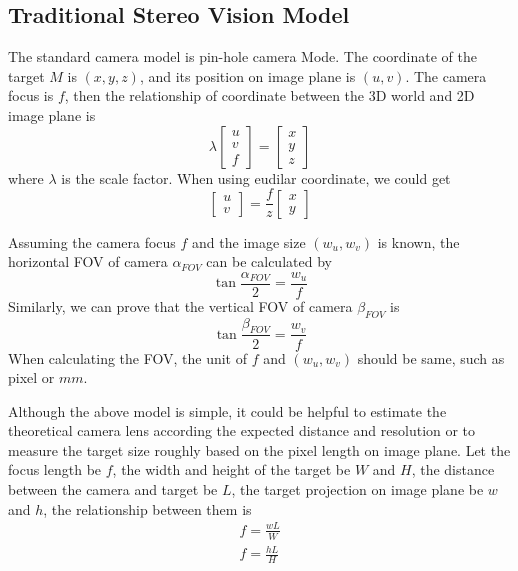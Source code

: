 \subsection{Traditional Stereo Vision Model}
The standard camera model is pin-hole camera Mode. The coordinate of the target $M$ is $(x,y,z)$, and its position on image plane is $(u,v)$. The camera focus is $f$, then the relationship of coordinate between the 3D world and 2D image plane is 
\begin{equation}
\lambda\left[ {\begin{array}{*{20}{c}}
	u \\ 
	v \\ 
	f 
	\end{array}} \right] =\left[ {\begin{array}{*{20}{c}}
	x \\ 
	y \\ 
	z 
	\end{array}} \right]
\end{equation}
where $\lambda$ is the scale factor. When using eudilar coordinate, we could get
\begin{equation}
\left[ {\begin{array}{*{20}{c}}
	u \\ 
	v 
	\end{array}} \right] =\frac{f}{z} \left[ {\begin{array}{*{20}{c}}
	x \\ 
	y   
	\end{array}} \right]
\end{equation}

Assuming the camera focus $f$ and the image size $(w_u,w_v)$ is known, the horizontal FOV of camera $\alpha_{FOV}$ can be calculated by
\begin{equation}
\tan{\frac{\alpha_{FOV}}{2}}=\frac{w_u}{f}
\end{equation}
Similarly, we can prove that the vertical FOV of camera $\beta_{FOV}$ is
\begin{equation}
\tan{\frac{\beta_{FOV}}{2}}=\frac{w_v}{f}
\end{equation}
When calculating the FOV, the unit of $f$ and $(w_u,w_v)$ should be same, such as pixel or $mm$.

Although the above model is simple, it could be helpful to estimate the theoretical camera lens according the expected distance and resolution or to measure the target size roughly based on the pixel length on image plane. Let the focus length be $f$, the width and height of the target be $W$ and $H$, the distance between the camera and target be $L$, the target projection on image plane be $w$ and $h$, the relationship between them is  
\begin{align}
f=\frac{wL}{W} \\
f=\frac{hL}{H}
\end{align}

